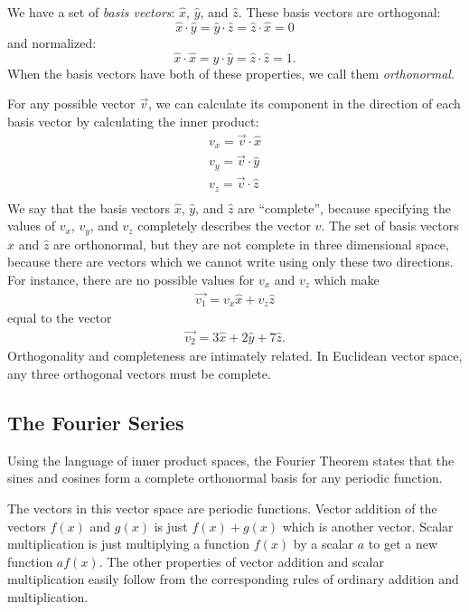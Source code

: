 \documentclass[12pt]{book}
\begin{document}
\noindent
We have a set of {\em basis vectors}: $\hat{x}$, $\hat{y}$, and $\hat{z}$.  These basis vectors are orthogonal:
\begin{displaymath}
\hat{x} \cdot \hat{y} = \hat{y} \cdot \hat{z} = \hat{z} \cdot \hat{x} = 0
\end{displaymath}
and normalized:
\begin{displaymath}
\hat{x} \cdot \hat{x} = \hat{y} \cdot \hat{y} = \hat{z} \cdot \hat{z} = 1.
\end{displaymath}
When the basis vectors have both of these properties, we call them {\em orthonormal}.

For any possible vector $\vec{v}$, we can calculate its component in the direction of each basis vector by calculating the inner product:
\begin{eqnarray*}
v_x = \vec{v} \cdot \hat{x} \\
v_y = \vec{v} \cdot \hat{y} \\
v_z = \vec{v} \cdot \hat{z} \\
\end{eqnarray*}
We say that the basis vectors $\hat{x}$, $\hat{y}$, and $\hat{z}$ are ``complete'', because specifying the values of $v_x$, $v_y$, and $v_z$ completely describes the vector $v$.  The set of basis vectors $\hat{x}$ and $\hat{z}$ are orthonormal, but they are not complete in three dimensional space, because there are vectors which we cannot write using only these two directions.  For instance, there are no possible values for $v_x$ and $v_z$
which make
\begin{eqnarray*}
 \vec{v_1} = v_x \hat{x} + v_z \hat{z}
\end{eqnarray*}
equal to the vector
\begin{eqnarray*}
 \vec{v_2} = 3 \hat{x} + 2 \hat{y} + 7 \hat{z}.
\end{eqnarray*}
Orthogonality and completeness are intimately related.  In Euclidean vector space, any three orthogonal vectors must be complete.
 
\subsection{The Fourier Series}

Using the language of inner product spaces, the Fourier Theorem states that the sines and cosines form a complete orthonormal basis for any periodic function.  

The vectors in this vector space are periodic functions.  Vector addition of the vectors $f(x)$ and $g(x)$ is just $f(x) + g(x)$ which is another vector.  Scalar multiplication is just multiplying a function $f(x)$ by a scalar $a$ to get a new function $a f(x)$.  The other properties of vector addition and scalar multiplication easily follow from the corresponding rules of ordinary addition and multiplication.
\end{document}
